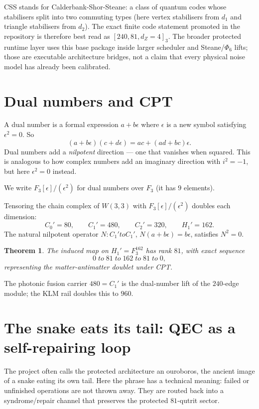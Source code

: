 \documentclass[11pt]{article}
\def\mathbb#1{#1}%
\def\textbf#1{#1}%
\def\Phi#1{Phi#1}%
\def\to{ to }%
\newtheorem*{theorem}{Theorem}
\newcommand{\W}{W(3,3)}
\begin{document}
CSS stands for Calderbank-Shor-Steane: a class of quantum codes whose stabilisers split into two commuting types (here vertex stabilisers from $d_1$ and triangle stabilisers from $d_2$). The exact finite code statement promoted in the repository is therefore best read as $[240,81,d_Z=4]_3$. The broader protected runtime layer uses this base package inside larger scheduler and Steane/$\Phi_6$ lifts; those are executable architecture bridges, not a claim that every physical noise model has already been calibrated.

\section{Dual numbers and CPT}

\begin{mathnote}
A \textbf{dual number} is a formal expression $a + b\epsilon$ where $\epsilon$ is a new symbol satisfying $\epsilon^2 = 0$. So
\[
(a + b\epsilon)(c + d\epsilon) = ac + (ad + bc)\epsilon.
\]
Dual numbers add a \emph{nilpotent} direction --- one that vanishes when squared. This is analogous to how complex numbers add an imaginary direction with $i^2 = -1$, but here $\epsilon^2 = 0$ instead.

We write $\mathbb{F}_3[\epsilon]/(\epsilon^2)$ for dual numbers over $\mathbb{F}_3$ (it has $9$ elements).
\end{mathnote}

Tensoring the chain complex of $\W$ with $\mathbb{F}_3[\epsilon]/(\epsilon^2)$ doubles each dimension:
\[
C_0' = 80, \qquad C_1' = 480, \qquad C_2' = 320, \qquad H_1' = 162.
\]
The natural nilpotent operator $N: C_1' \to C_1'$, $N(a + b\epsilon) = b\epsilon$, satisfies $N^2 = 0$.

\begin{theorem}
The induced map on $H_1' = \mathbb{F}_3^{162}$ has rank $81$, with exact sequence
\[
0 \;\to\; 81 \;\to\; 162 \;\to\; 81 \;\to\; 0,
\]
representing the matter-antimatter doublet under CPT.
\end{theorem}

The photonic fusion carrier $480 = C_1'$ is the dual-number lift of the $240$-edge module; the KLM rail doubles this to $960$.

\section{The snake eats its tail: QEC as a self-repairing loop}

The project often calls the protected architecture an \textbf{ouroboros}, the ancient image of a snake eating its own tail. Here the phrase has a technical meaning: failed or unfinished operations are not thrown away. They are routed back into a syndrome/repair channel that preserves the protected $81$-qutrit sector.
\end{document}
